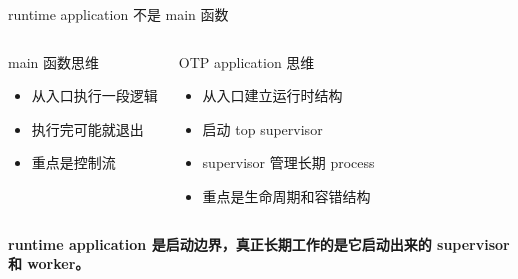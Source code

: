\documentclass[aspectratio=169, 9pt]{beamer}
\newcommand{\good}[1]{\textbf{\color{accent!80!black}#1}}
\begin{document}
\begin{frame}{runtime application 不是 main 函数}
  \begin{columns}[T,onlytextwidth]
    \begin{block}{main 函数思维}
      \begin{itemize}
        \item 从入口执行一段逻辑
        \item 执行完可能就退出
        \item 重点是控制流
      \end{itemize}
    \end{block}
    \footnotesize
    \begin{exampleblock}{OTP application 思维}
      \begin{itemize}
        \item 从入口建立运行时结构
        \item 启动 top supervisor
        \item supervisor 管理长期 process
        \item 重点是生命周期和容错结构
      \end{itemize}
    \end{exampleblock}
  \end{columns}
  \vspace{0.25cm}
  \centering
  \good{runtime application 是启动边界，真正长期工作的是它启动出来的 supervisor 和 worker。}
\end{frame}
\end{document}

